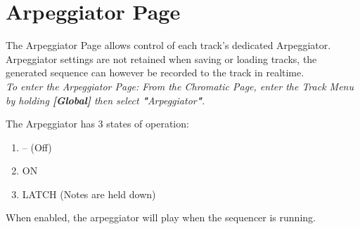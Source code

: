 \chapter{Arpeggiator Page}
The Arpeggiator Page allows control of each track's dedicated Arpeggiator. Arpeggiator settings are not retained when saving or loading tracks, the generated sequence can however be recorded to the track in realtime.
\\
\textit{To enter the Arpeggiator Page: From the Chromatic Page, enter the Track Menu by holding\textbf{ [Global]} then select \textbf{"}Arpeggiator\textbf{"}. }

The Arpeggiator has 3 states of operation:
\begin{enumerate}
    \item -- (Off)
    \item ON
    \item LATCH (Notes are held down)
\end{enumerate}

When enabled, the arpeggiator will play when the sequencer is running. 


